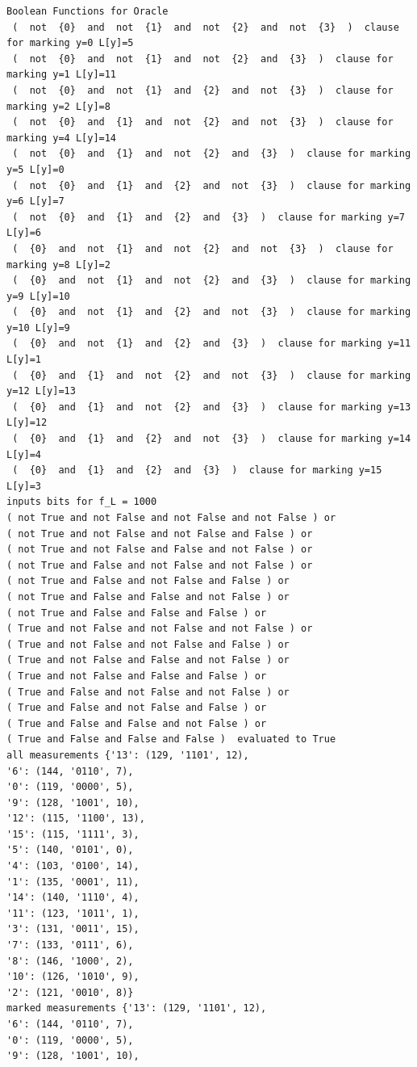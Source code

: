 \documentclass[11pt]{article}
\begin{document}
\begin{verbatim}
Boolean Functions for Oracle
 (  not  {0}  and  not  {1}  and  not  {2}  and  not  {3}  )  clause for marking y=0 L[y]=5
 (  not  {0}  and  not  {1}  and  not  {2}  and  {3}  )  clause for marking y=1 L[y]=11
 (  not  {0}  and  not  {1}  and  {2}  and  not  {3}  )  clause for marking y=2 L[y]=8
 (  not  {0}  and  {1}  and  not  {2}  and  not  {3}  )  clause for marking y=4 L[y]=14
 (  not  {0}  and  {1}  and  not  {2}  and  {3}  )  clause for marking y=5 L[y]=0
 (  not  {0}  and  {1}  and  {2}  and  not  {3}  )  clause for marking y=6 L[y]=7
 (  not  {0}  and  {1}  and  {2}  and  {3}  )  clause for marking y=7 L[y]=6
 (  {0}  and  not  {1}  and  not  {2}  and  not  {3}  )  clause for marking y=8 L[y]=2
 (  {0}  and  not  {1}  and  not  {2}  and  {3}  )  clause for marking y=9 L[y]=10
 (  {0}  and  not  {1}  and  {2}  and  not  {3}  )  clause for marking y=10 L[y]=9
 (  {0}  and  not  {1}  and  {2}  and  {3}  )  clause for marking y=11 L[y]=1
 (  {0}  and  {1}  and  not  {2}  and  not  {3}  )  clause for marking y=12 L[y]=13
 (  {0}  and  {1}  and  not  {2}  and  {3}  )  clause for marking y=13 L[y]=12
 (  {0}  and  {1}  and  {2}  and  not  {3}  )  clause for marking y=14 L[y]=4
 (  {0}  and  {1}  and  {2}  and  {3}  )  clause for marking y=15 L[y]=3
inputs bits for f_L = 1000
( not True and not False and not False and not False ) or 
( not True and not False and not False and False ) or 
( not True and not False and False and not False ) or 
( not True and False and not False and not False ) or 
( not True and False and not False and False ) or 
( not True and False and False and not False ) or 
( not True and False and False and False ) or 
( True and not False and not False and not False ) or 
( True and not False and not False and False ) or 
( True and not False and False and not False ) or 
( True and not False and False and False ) or 
( True and False and not False and not False ) or 
( True and False and not False and False ) or 
( True and False and False and not False ) or 
( True and False and False and False )  evaluated to True
all measurements {'13': (129, '1101', 12), 
'6': (144, '0110', 7), 
'0': (119, '0000', 5), 
'9': (128, '1001', 10), 
'12': (115, '1100', 13), 
'15': (115, '1111', 3), 
'5': (140, '0101', 0), 
'4': (103, '0100', 14), 
'1': (135, '0001', 11), 
'14': (140, '1110', 4), 
'11': (123, '1011', 1), 
'3': (131, '0011', 15), 
'7': (133, '0111', 6), 
'8': (146, '1000', 2), 
'10': (126, '1010', 9), 
'2': (121, '0010', 8)}
marked measurements {'13': (129, '1101', 12), 
'6': (144, '0110', 7), 
'0': (119, '0000', 5), 
'9': (128, '1001', 10), 

\end{verbatim}
\end{document}
